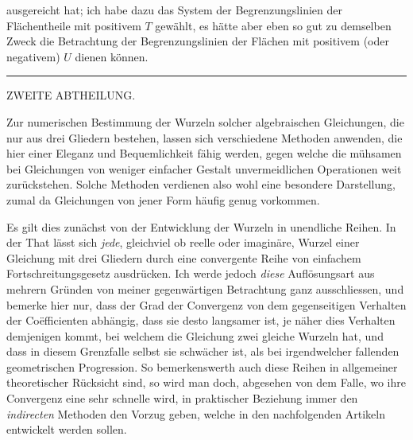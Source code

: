ausgereicht hat; ich habe dazu das System der Begrenzungslinien der Flächentheile
mit positivem $T$ gewählt, es hätte aber eben so gut zu demselben Zweck die Betrachtung der Begrenzungslinien der Flächen mit positivem (oder negativem) $U$
dienen können.

\begin{center}\rule{0.16\linewidth}{0.4pt}\end{center}
\begin{center}ZWEITE ABTHEILUNG.\end{center}

Zur numerischen Bestimmung der Wurzeln solcher algebraischen Gleichungen, die nur aus drei Gliedern bestehen, lassen sich verschiedene Methoden anwenden, die hier einer Eleganz und Bequemlichkeit fähig werden, gegen welche
die mühsamen bei Gleichungen von weniger einfacher Gestalt unvermeidlichen
Operationen weit zurückstehen. Solche Methoden verdienen also wohl eine besondere Darstellung, zumal da Gleichungen von jener Form häufig genug vorkommen.

Es gilt dies zunächst von der Entwicklung der Wurzeln in unendliche Reihen. In der That lässt sich \textit{jede}, gleichviel ob reelle oder imaginäre, Wurzel einer Gleichung mit drei Gliedern durch eine convergente Reihe von einfachem
Fortschreitungsgesetz ausdrücken. Ich werde jedoch \textit{diese} Auflösungsart aus mehrern Gründen von meiner gegenwärtigen Betrachtung ganz ausschliessen, und bemerke hier nur, dass der Grad der Convergenz von dem gegenseitigen Verhalten
der Coëfficienten abhängig, dass sie desto langsamer ist, je näher dies Verhalten
demjenigen kommt, bei welchem die Gleichung zwei gleiche Wurzeln hat, und
dass in diesem Grenzfalle selbst sie schwächer ist, als bei irgendwelcher fallenden
geometrischen Progression. So bemerkenswerth auch diese Reihen in allgemeiner
theoretischer Rücksicht sind, so wird man doch, abgesehen von dem Falle, wo
ihre Convergenz eine sehr schnelle wird, in praktischer Beziehung immer den \textit{indirecten} Methoden den Vorzug geben, welche in den nachfolgenden Artikeln entwickelt werden sollen.

